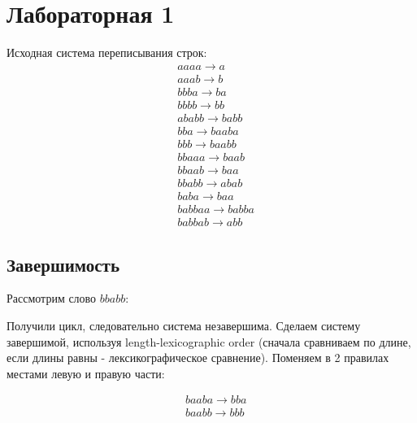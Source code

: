 \documentclass{article}
\begin{document}
\section*{Лабораторная 1}

Исходная система переписывания строк:
\begin{align*}
&aaaa \rightarrow a \\
&aaab \rightarrow b \\
&bbba \rightarrow ba \\
&bbbb \rightarrow bb \\
&ababb \rightarrow babb \\
&bba \rightarrow baaba \\
&bbb \rightarrow baabb \\
&bbaaa \rightarrow baab \\
&bbaab \rightarrow baa \\
&bbabb \rightarrow abab \\
&baba \rightarrow baa \\
&babbaa \rightarrow babba \\
&babbab \rightarrow abb
\end{align*}

\subsection*{Завершимость}

Рассмотрим слово $bbabb$:
\begin{center}
\end{center}

Получили цикл, следовательно система незавершима. Сделаем систему завершимой, используя length-lexicographic order (сначала сравниваем по длине, если длины равны - лексикографическое сравнение). Поменяем в 2 правилах местами левую и правую части:

\begin{align*}
&baaba \rightarrow bba \\
&baabb \rightarrow bbb
\end{align*}
\end{document}

